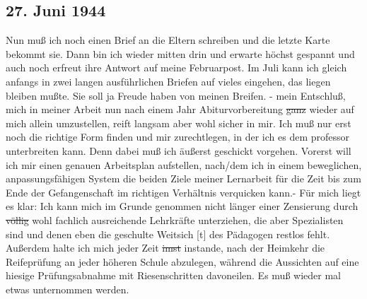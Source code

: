 \subsection{27. Juni 1944}

Nun mu{\ss} ich noch einen Brief an die Eltern schreiben und die letzte Karte bekommt sie.
Dann bin ich wieder mitten drin und erwarte h\"{o}chst gespannt und auch noch erfreut ihre Antwort auf meine Februarpost.
Im Juli kann ich gleich anfangs in zwei langen ausf\"{u}hrlichen Briefen auf vieles eingehen, das liegen bleiben mu{\ss}te.
Sie soll ja Freude haben von meinen Breifen.
- mein Entschlu{\ss}, mich in meiner Arbeit nun nach einem Jahr Abiturvorbereitung \st{ganz} wieder auf mich allein umzustellen, reift langsam aber wohl sicher in mir.
Ich mu{\ss} nur erst noch die richtige Form finden und mir zurechtlegen, in der ich es dem professor unterbreiten kann.
Denn dabei mu{\ss} ich \"{a}u{\ss}erst geschickt vorgehen.
Vorerst will ich mir einen genauen Arbeitsplan aufstellen, nach/dem ich in einem beweglichen, anpassungsf\"{a}higen System die beiden Ziele meiner Lernarbeit f\"{u}r die Zeit bis zum Ende der Gefangenschaft im richtigen Verh\"{a}ltnis verquicken kann.-
F\"{u}r mich liegt es klar: Ich kann mich im Grunde genommen nicht l\"{a}nger einer Zensierung durch \st{v\"{o}llig} wohl fachlich ausreichende Lehrkr\"{a}fte unterziehen, die aber Spezialisten sind und denen eben die geschulte Weitsich{\color{red} [t] } des P\"{a}dagogen restlos fehlt.
Au{\ss}erdem halte ich mich jeder Zeit \st{imst} instande, nach der Heimkehr die Reifepr\"{u}fung an jeder h\"{o}heren Schule abzulegen, w\"{a}hrend die Aussichten auf eine hiesige Pr\"{u}fungsabnahme mit Riesenschritten davoneilen.
Es mu{\ss} wieder mal etwas unternommen werden.

\clearpage
